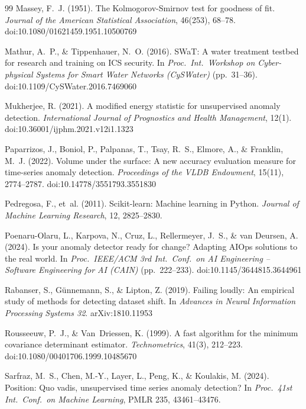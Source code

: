 \documentclass[11pt]{article}
\begin{document}
\begin{thebibliography}{99}
 Massey, F.~J. (1951). The Kolmogorov-Smirnov test for goodness of fit. \emph{Journal of the American Statistical Association}, 46(253), 68--78. doi:10.1080/01621459.1951.10500769

 Mathur, A.~P., \& Tippenhauer, N.~O. (2016). SWaT: A water treatment testbed for research and training on ICS security. In \emph{Proc.\ Int.\ Workshop on Cyber-physical Systems for Smart Water Networks (CySWater)} (pp.\ 31--36). doi:10.1109/CySWater.2016.7469060

 Mukherjee, R. (2021). A modified energy statistic for unsupervised anomaly detection. \emph{International Journal of Prognostics and Health Management}, 12(1). doi:10.36001/ijphm.2021.v12i1.1323

 Paparrizos, J., Boniol, P., Palpanas, T., Tsay, R.~S., Elmore, A., \& Franklin, M.~J. (2022). Volume under the surface: A new accuracy evaluation measure for time-series anomaly detection. \emph{Proceedings of the VLDB Endowment}, 15(11), 2774--2787. doi:10.14778/3551793.3551830

 Pedregosa, F., et~al. (2011). Scikit-learn: Machine learning in Python. \emph{Journal of Machine Learning Research}, 12, 2825--2830.

 Poenaru-Olaru, L., Karpova, N., Cruz, L., Rellermeyer, J.~S., \& van Deursen, A. (2024). Is your anomaly detector ready for change? Adapting AIOps solutions to the real world. In \emph{Proc.\ IEEE/ACM 3rd Int.\ Conf.\ on AI Engineering -- Software Engineering for AI (CAIN)} (pp.\ 222--233). doi:10.1145/3644815.3644961

 Rabanser, S., G\"unnemann, S., \& Lipton, Z. (2019). Failing loudly: An empirical study of methods for detecting dataset shift. In \emph{Advances in Neural Information Processing Systems 32}. arXiv:1810.11953

 Rousseeuw, P.~J., \& Van~Driessen, K. (1999). A fast algorithm for the minimum covariance determinant estimator. \emph{Technometrics}, 41(3), 212--223. doi:10.1080/00401706.1999.10485670

 Sarfraz, M.~S., Chen, M.-Y., Layer, L., Peng, K., \& Koulakis, M. (2024). Position: Quo vadis, unsupervised time series anomaly detection? In \emph{Proc.\ 41st Int.\ Conf.\ on Machine Learning}, PMLR 235, 43461--43476.


\end{thebibliography}
\end{document}
